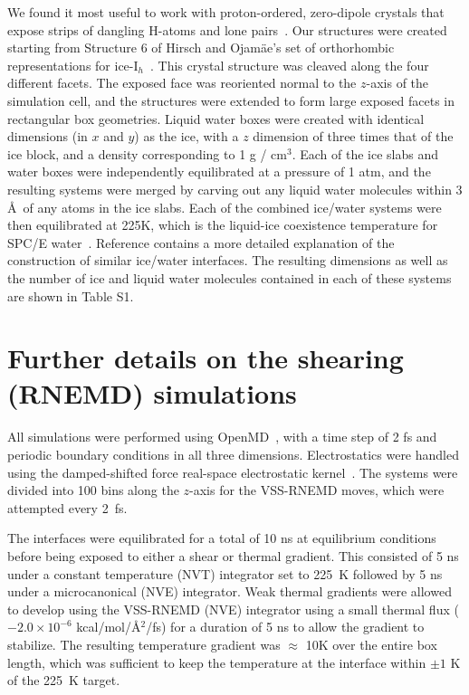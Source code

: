 \documentclass{pnastwo}
\begin{document}
\begin{article}
We found it most useful to work with proton-ordered, zero-dipole
crystals that expose strips of dangling H-atoms and lone
pairs~\cite{Buch:2008fk}.  Our structures were created starting from
Structure 6 of Hirsch and Ojam\"{a}e's set of orthorhombic
representations for ice-I$_{h}$~\cite{Hirsch04}.  This crystal
structure was cleaved along the four different facets.  The exposed
face was reoriented normal to the $z$-axis of the simulation cell, and
the structures were extended to form large exposed facets in
rectangular box geometries.  Liquid water boxes were created with
identical dimensions (in $x$ and $y$) as the ice, with a $z$ dimension
of three times that of the ice block, and a density corresponding to 1
g / cm$^3$.  Each of the ice slabs and water boxes were independently
equilibrated at a pressure of 1 atm, and the resulting systems were
merged by carving out any liquid water molecules within 3 \AA\ of any
atoms in the ice slabs.  Each of the combined ice/water systems were
then equilibrated at 225K, which is the liquid-ice coexistence
temperature for SPC/E water~\cite{Bryk02}. Reference
\citealp{Louden13} contains a more detailed explanation of the
construction of similar ice/water interfaces. The resulting dimensions
as well as the number of ice and liquid water molecules contained in
each of these systems are shown in Table S1.

\section{Further details on the shearing (RNEMD) simulations}
All simulations were performed using OpenMD~\cite{OOPSE,openmd}, with a
time step of 2 fs and periodic boundary conditions in all three
dimensions.  Electrostatics were handled using the damped-shifted
force real-space electrostatic kernel~\cite{Ewald}. The systems were
divided into 100 bins along the $z$-axis for the VSS-RNEMD moves,
which were attempted every 2~fs.

The interfaces were equilibrated for a total of 10 ns at equilibrium
conditions before being exposed to either a shear or thermal gradient.
This consisted of 5 ns under a constant temperature (NVT) integrator
set to 225~K followed by 5 ns under a microcanonical (NVE) integrator.
Weak thermal gradients were allowed to develop using the VSS-RNEMD
(NVE) integrator using a small thermal flux ($-2.0\times 10^{-6}$
kcal/mol/\AA$^2$/fs) for a duration of 5 ns to allow the gradient to
stabilize.  The resulting temperature gradient was $\approx$ 10K over
the entire box length, which was sufficient to keep the temperature at
the interface within $\pm 1$ K of the 225~K target.


\end{article}
\end{document}
